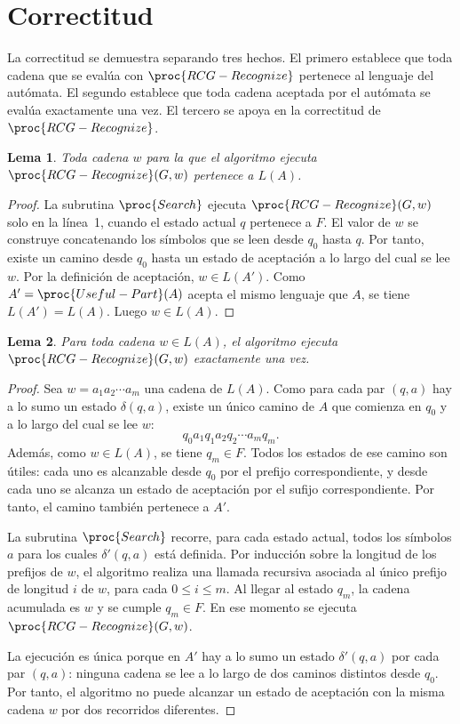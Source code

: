 \documentclass{report}
\theoremstyle{definition}
\theoremstyle{plain}
\newtheorem{lema}{Lema}[chapter]
\theoremstyle{remark}
\begin{document}
\section{Correctitud}
\label{sec:correctitud-algoritmo}

La correctitud se demuestra separando tres hechos. El primero establece
que toda cadena que se evalúa con $\proc{RCG-Recognize}$ pertenece al
lenguaje del autómata. El segundo establece que toda cadena aceptada por
el autómata se evalúa exactamente una vez. El tercero se apoya en la
correctitud de $\proc{RCG-Recognize}$.

\begin{lema}
\label{lema:sonido-automata}
Toda cadena $w$ para la que el algoritmo ejecuta
$\proc{RCG-Recognize}(G,w)$ pertenece a $L(A)$.
\end{lema}

\begin{proof}
La subrutina $\proc{Search}$ ejecuta $\proc{RCG-Recognize}(G,w)$ solo en
la línea~1, cuando el estado actual $q$ pertenece a $F$. El valor de $w$
se construye concatenando los símbolos que se leen desde $q_0$ hasta
$q$. Por tanto, existe un camino desde $q_0$ hasta un estado de
aceptación a lo
largo del cual se lee $w$. Por la definición de aceptación,
$w \in L(A')$. Como $A'=\proc{Useful-Part}(A)$ acepta el mismo lenguaje
que $A$, se tiene $L(A')=L(A)$. Luego $w \in L(A)$.
\end{proof}

\begin{lema}
\label{lema:completo-automata}
Para toda cadena $w \in L(A)$, el algoritmo ejecuta
$\proc{RCG-Recognize}(G,w)$ exactamente una vez.
\end{lema}

\begin{proof}
Sea $w=a_1a_2\cdots a_m$ una cadena de $L(A)$. Como para cada par
$(q,a)$ hay a lo sumo un estado $\delta(q,a)$, existe un único camino de
$A$ que comienza en $q_0$ y a lo largo del cual se lee $w$:
\[
  q_0 a_1 q_1 a_2 q_2 \cdots a_m q_m.
\]
Además, como $w \in L(A)$, se tiene $q_m \in F$. Todos los estados de ese
camino son útiles: cada uno es alcanzable desde $q_0$ por el prefijo
correspondiente, y desde cada uno se alcanza un estado de aceptación
por el
sufijo correspondiente. Por tanto, el camino también pertenece a $A'$.

La subrutina $\proc{Search}$ recorre, para cada estado actual, todos los
símbolos $a$ para los cuales $\delta'(q,a)$ está definida. Por inducción
sobre la longitud de los prefijos de $w$, el algoritmo realiza una
llamada recursiva asociada al único prefijo de longitud $i$ de $w$, para
cada $0 \le i \le m$. Al llegar al estado $q_m$, la cadena acumulada es
$w$ y se cumple $q_m \in F$. En ese momento se ejecuta
$\proc{RCG-Recognize}(G,w)$.

La ejecución es única porque en $A'$ hay a lo sumo un estado
$\delta'(q,a)$ por cada par $(q,a)$: ninguna cadena se lee a lo largo
de dos caminos distintos desde $q_0$.
Por tanto, el algoritmo no puede alcanzar un estado de aceptación con
la misma
cadena $w$ por dos recorridos diferentes.
\end{proof}
\end{document}

